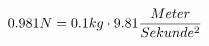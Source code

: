 \documentclass[preview]{standalone}
\begin{document}
\begin{align*}
\special{dvisvgm:raw <g id='unique000'>}0.981N = 0.1 kg \cdot 9.81 \frac{Meter}{Sekunde^{2}}\special{dvisvgm:raw </g>}
\end{align*}
\end{document}
